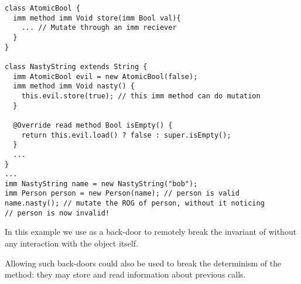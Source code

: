 \loseSpace
\noindent{}
\begin{lstlisting}
class AtomicBool {
  imm method imm Void store(imm Bool val){
    ... // Mutate through an imm reciever
  }
}

class NastyString extends String {
  imm AtomicBool evil = new AtomicBool(false);
  imm method imm Void nasty() {
    this.evil.store(true); // this imm method can do mutation
  }

  @Override read method Bool isEmpty() {
    return this.evil.load() ? false : super.isEmpty();
  }
  ...
}
...
imm NastyString name = new NastyString("bob");
imm Person person = new Person(name); // person is valid
name.nasty(); // mutate the ROG of person, without it noticing
// person is now invalid!
\end{lstlisting}

In this example we use \Q@AtomicBool@ as a back-door to remotely break the invariant of \Q@person@ without any interaction with the \Q@person@ object itself.


Allowing such back-doors could also be used to break the determinism of the \validate{} method: they may store and read information about previous calls.

